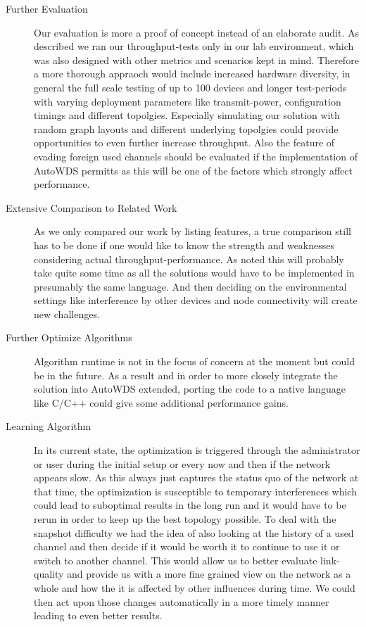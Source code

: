     \begin{description}
      \item [Further Evaluation]
	Our evaluation is more a proof of concept instead of an elaborate audit. As described we ran our throughput-tests only in our lab environment, 
	which was also designed with other metrics and scenarios kept in mind. Therefore a more thorough appraoch would include increased hardware diversity, 
	in general the full scale testing of up to 100 devices and longer test-periods with varying deployment parameters like transmit-power, 
	configuration timings and different topolgies.
	Especially simulating our solution with random graph layouts and different underlying topolgies could provide opportunities to even further increase throughput.
	Also the feature of evading foreign used channels should be evaluated if the implementation of 
	AutoWDS permitts as this will be one of the factors which strongly affect performance.
      
      \item[Extensive Comparison to Related Work]
	As we only compared our work by listing features, a true comparison still has to be done if one would 
	like to know the strength and weaknesses considering actual throughput-performance.
	As noted this will probably take quite some time as all the solutions would have to be 
	implemented in presumably the same language. And then deciding on the environmental settings
	like interference by other devices and node connectivity will create new challenges.
      
      \item[Further Optimize Algorithms]
	Algorithm runtime is not in the focus of concern at the moment but could be in the future. 
	As a result and in order to more closely integrate the solution into AutoWDS extended,
	porting the code to a native language like C/C++ could give some additional performance gains.
      
      \item[Learning Algorithm]
	In its current state, the optimization is triggered through the administrator or user during the initial setup or every now and then if
	the network appears slow. As this always just captures the status quo of the network at that time, the optimization is susceptible to
	temporary interferences which could lead to suboptimal results in the long run and it would have to be rerun in order to keep up the best topology possible.
	To deal with the snapshot difficulty we had the idea of also looking at the history of a used channel and then decide if it would be worth it to continue
	to use it or switch to another channel. This would allow us to better evaluate link-quality and provide us with a more fine grained view on the network as a whole
	and how the it is affected by other influences during time. 
	We could then act upon those changes automatically in a more timely manner leading to even better results.
	
    \end{description}